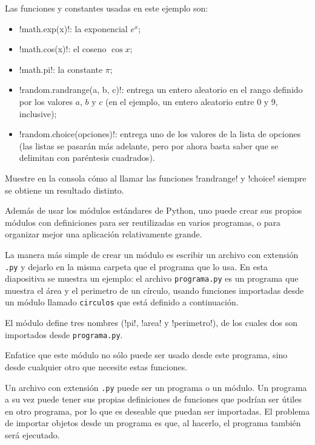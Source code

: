 \documentclass[10pt]{article}
\begin{document}
  Las funciones y constantes usadas en este ejemplo son:
  \begin{itemize}
    \item \li!math.exp(x)!: la exponencial \(e^x\);
    \item \li!math.cos(x)!: el coseno \(\cos x\);
    \item \li!math.pi!: la constante \(\pi\);
    \item \li!random.randrange(a, b, c)!: entrega un entero aleatorio
      en el rango definido por los valores \(a\), \(b\) y \(c\)
      (en el ejemplo, un entero aleatorio entre 0 y 9, inclusive);
    \item \li!random.choice(opciones)!: entrega uno de los valores de la lista de opciones
      (las listas se pasarán más adelante,
      pero por ahora basta saber que se delimitan con paréntesis cuadrados).
  \end{itemize}

  Muestre en la consola cómo al llamar las funciones \li!randrange! y \li!choice!
  siempre se obtiene un resultado distinto.


  Además de usar los módulos estándares de Python,
  uno puede crear sus propios módulos con definiciones
  para ser reutilizadas en varios programas,
  o para organizar mejor una aplicación relativamente grande.

  La manera más simple de crear un módulo
  es escribir un archivo con extensión \verb!.py!
  y dejarlo en la misma carpeta que el programa que lo usa.
  En esta diapositiva se muestra un ejemplo:
  el archivo \verb!programa.py! es un programa que muestra el área y el perimetro de un círculo,
  usando funciones importadas desde un módulo llamado \verb!circulos!
  que está definido a continuación.

  El módulo define tres nombres (\li!pi!, \li!area! y \li!perimetro!),
  de los cuales dos son importados desde \verb!programa.py!.

  Enfatice que este módulo no sólo puede ser usado desde este programa,
  sino desde cualquier otro que necesite estas funciones.


  Un archivo con extensión \verb!.py! puede ser un programa o un módulo.
  Un programa a su vez puede tener sus propias definiciones de funciones
  que podrían ser útiles en otro programa,
  por lo que es deseable que puedan ser importadas.
  El problema de importar objetos desde un programa
  es que, al hacerlo, el programa también será ejecutado.
\end{document}
